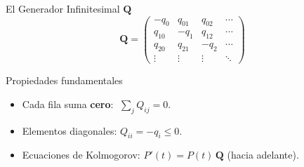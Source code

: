 \documentclass[aspectratio=1610, 10pt]{beamer}
\newcommand{\bQ}{\mathbf{Q}}
\begin{document}
\begin{frame}{El Generador Infinitesimal $\bQ$}
  \[
    \bQ = \begin{pmatrix}
      -q_0    & q_{01} & q_{02} & \cdots \\[3pt]
      q_{10}  & -q_1   & q_{12} & \cdots \\[3pt]
      q_{20}  & q_{21}  & -q_2  & \cdots \\[3pt]
      \vdots  & \vdots  & \vdots & \ddots
    \end{pmatrix}
  \]

  \begin{alertblock}{Propiedades fundamentales}
    \begin{itemize}
      \item Cada fila suma \textbf{cero}: $\;\displaystyle\sum_j Q_{ij}=0$.
      \item Elementos diagonales: $Q_{ii} = -q_i \le 0$.
      \item Ecuaciones de Kolmogorov: $P'(t) = P(t)\,\bQ$ \;(hacia adelante).
    \end{itemize}
  \end{alertblock}
\end{frame}
\end{document}
